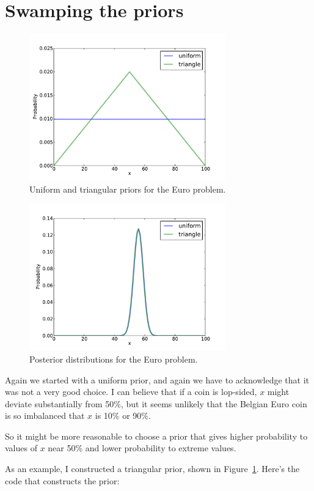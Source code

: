 \documentclass[12pt]{book}
\begin{document}
\section{Swamping the priors}

\begin{figure}
\centerline{\includegraphics[height=2.5in]{figs/euro2.pdf}}
\caption{Uniform and triangular priors for the
Euro problem.}
\label{fig.euro2}
\end{figure}

\begin{figure}
\centerline{\includegraphics[height=2.5in]{figs/euro3.pdf}}
\caption{Posterior distributions for the Euro problem.}
\label{fig.euro3}
\end{figure}

Again we started with a uniform prior, and again we have to
acknowledge that it was not a very good choice. I can believe
that if a coin is lop-sided, $x$ might deviate substantially from
50\%, but it seems unlikely that the Belgian Euro coin is so
imbalanced that $x$ is 10\% or 90\%.

So it might be more reasonable to choose a prior that gives
higher probability to values of $x$ near 50\% and lower probability
to extreme values.

As an example, I constructed a triangular prior, shown in
Figure~\ref{fig.euro2}.  Here's the code that constructs the prior:
\end{document}
